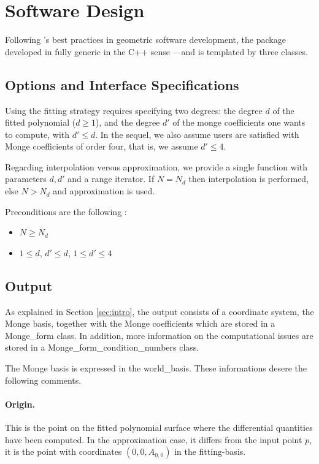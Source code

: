 \section{Software Design}

Following \cgal's best practices in geometric software development,
the package developed in fully generic in the C++ sense ---and is
templated by three classes.

\subsection{Options and Interface Specifications}

Using the fitting strategy requires specifying two degrees: the degree
$d$ of the fitted polynomial ($d \geq 1$), and the degree $d'$ of the
monge coefficients one wants to compute, with $d' \leq d $.  In the sequel,
we also assume users are satisfied with Monge coefficients of order
four, that is, we assume $d' \leq 4$.
\medskip

Regarding interpolation versus approximation, we provide a single
function  with parameters $d,d'$ and a
range iterator. If $N=N_d$ then interpolation is performed, else
$N > N_d$ and approximation is used. 

Preconditions are the following :

\begin{itemize}
\item
$N \geq N_d$
\item
$1 \leq d$, $d' \leq d$, $1 \leq d' \leq 4$ 
\end{itemize}	
 
\subsection{Output}

As explained in Section \ref{sec:intro}, the output consists of a
coordinate system, the Monge basis, together with the Monge
coefficients which are stored in a Monge\_form class. In addition, more
information on the computational issues are stored in a Monge\_form\_condition\_numbers
class.

The Monge basis is expressed in the world\_basis. These informations
desere the following comments.

\paragraph{Origin.} This is the point on the fitted polynomial surface
where the differential quantities have been computed. In the
approximation case, it differs from the input point $p$, it is the
point with coordinates $(0,0,A_{0,0})$ in the fitting-basis.

